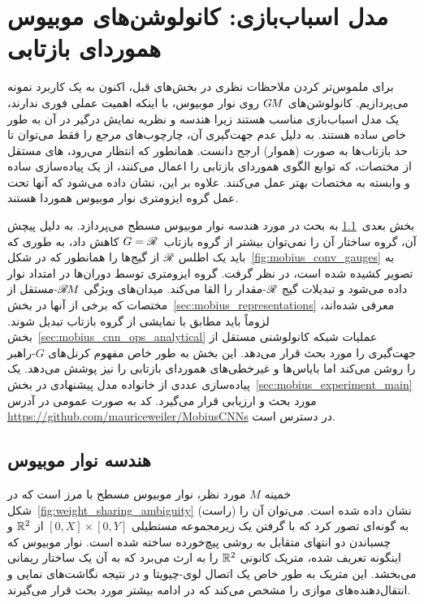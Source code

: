 

\section{مدل اسباب‌بازی: کانولوشن‌های موبیوس هموردای بازتابی}
\label{sec:mobius_conv}

برای ملموس‌تر کردن ملاحظات نظری در بخش‌های قبل، اکنون به یک کاربرد نمونه می‌پردازیم.
کانولوشن‌های $G\mkern-1.4muM$ روی نوار موبیوس، با اینکه اهمیت عملی فوری ندارند، یک مدل اسباب‌بازی مناسب هستند زیرا هندسه و نظریه نمایش درگیر در آن به طور خاص ساده هستند.
به دلیل عدم جهت‌گیری آن، چارچوب‌های مرجع را فقط می‌توان تا حد بازتاب‌ها به صورت (هموار) ارجح دانست.
همانطور که انتظار می‌رود، \CNN{}های مستقل از مختصات، که توابع الگوی هموردای بازتابی را اعمال می‌کنند، از یک پیاده‌سازی ساده و وابسته به مختصات بهتر عمل می‌کنند.
علاوه بر این، نشان داده می‌شود که آنها تحت عمل گروه ایزومتری نوار موبیوس هموردا هستند.

\etocsettocstyle{}{} %
\localtableofcontents

بخش بعدی~\ref{sec:mobius_geometry} به بحث در مورد هندسه نوار موبیوس مسطح می‌پردازد.
به دلیل پیچش آن، گروه ساختار آن را نمی‌توان بیشتر از گروه بازتاب~$G=\mathscr{R}$ کاهش داد، به طوری که باید یک اطلس $\mathscr{R}$ از گیج‌ها را همانطور که در شکل~\ref{fig:mobius_conv_gauges} به تصویر کشیده شده است، در نظر گرفت.
گروه ایزومتری توسط دوران‌ها در امتداد نوار داده می‌شود و تبدیلات گیج $\mathscr{R}$-مقدار را القا می‌کند.
میدان‌های ویژگی $\mathscr{R}\mkern-1.8muM$-مستقل از مختصات که برخی از آنها در بخش~\ref{sec:mobius_representations} معرفی شده‌اند، لزوماً باید مطابق با نمایشی از گروه بازتاب تبدیل شوند.
بخش~\ref{sec:mobius_cnn_ops_analytical} عملیات شبکه کانولوشنی مستقل از جهت‌گیری را مورد بحث قرار می‌دهد.
این بخش به طور خاص مفهوم کرنل‌های $G$-راهبر را روشن می‌کند اما بایاس‌ها و غیرخطی‌های هموردای بازتابی را نیز پوشش می‌دهد.
یک پیاده‌سازی عددی از خانواده مدل پیشنهادی در بخش~\ref{sec:mobius_experiment_main} مورد بحث و ارزیابی قرار می‌گیرد.
کد به صورت عمومی در آدرس \url{https://github.com/mauriceweiler/MobiusCNNs} در دسترس است.

\subsection{هندسه نوار موبیوس}
\label{sec:mobius_geometry}

خمینه $M$ مورد نظر، نوار موبیوس مسطح با مرز است که در شکل~\ref{fig:weight_sharing_ambiguity} (راست) نشان داده شده است.
می‌توان آن را به گونه‌ای تصور کرد که با گرفتن یک زیرمجموعه مستطیلی $[0,X] \times [0,Y]$ از $\mathbb{R}^2$ و چسباندن دو انتهای متقابل به روشی پیچ‌خورده ساخته شده است.
نوار موبیوس که اینگونه تعریف شده، متریک کانونی $\mathbb{R}^2$ را به ارث می‌برد که به آن یک ساختار ریمانی می‌بخشد.
این متریک به طور خاص یک اتصال لوی-چیویتا و در نتیجه نگاشت‌های نمایی و انتقال‌دهنده‌های موازی را مشخص می‌کند که در ادامه بیشتر مورد بحث قرار می‌گیرند.

